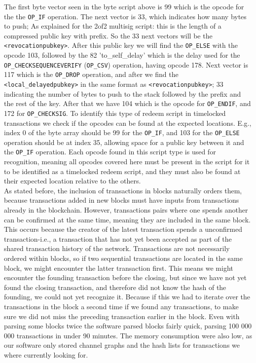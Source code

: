 The first byte vector seen in the byte script above is 99 which is the opcode for the the {\tt OP\_IF} operation. The next vector is 33, which indicates how many bytes to push; As explained for the 2of2 multisig script: this is the length of a compressed public key with prefix. So the 33 next vectors will be the {\tt <revocationpubkey>}. After this public key we will find the {\tt OP\_ELSE} with the opcode 103, followed by the 82 'to\_self\_delay' which is the delay used for the {\tt OP\_CHECKSEQUENCEVERIFY} ({\tt OP\_CSV}) operation, having opcode 178. 
Next vector is 117 which is the {\tt OP\_DROP} operation, and after we find the {\tt <local\_delayedpubkey>} in the same format as {\tt <revocationpubkey>}; 33 indicating the number of bytes to push to the stack followed by the prefix and the rest of the key. After that we have 104 which is the opcode for {\tt OP\_ENDIF}, and 172 for {\tt OP\_CHECKSIG}.
To identify this type of redeem script in timelocked transactions we check if the opcodes can be found at the expected locations. E.g., index 0 of the byte array should be 99 for the {\tt OP\_IF}, and 103 for the {\tt OP\_ELSE} operation should be at index 35, allowing space for a public key between it and the {\tt OP\_IF} operation. Each opcode found in this script type is used for recognition, meaning all opcodes covered here must be present in the script for it to be identified as a timelocked redeem script, and they must also be found at their expected location relative to the others.
\\

As stated before, the inclusion of transactions in blocks naturally orders them, because transactions added in new blocks must have inputs from transactions already in the blockchain.
However, transactions pairs where one spends another can be confirmed at the same time, meaning they are included in the same block.
This occurs because the creator of the latest transaction spends a unconfirmed transaction-i.e., a transaction that has not yet been accepted as part of the shared transaction history of the network. 
Transactions are not necessarily ordered within blocks, so if two sequential transactions are located in the same block, we might encounter the latter transaction first.
This means we might encounter the founding transaction before the closing, but since we have not yet found the closing transaction, and therefore did not know the hash of the founding, we could not yet recognize it.
Because if this we had to iterate over the transactions in the block a second time if we found any transactions, to make sure we did not miss the preceding transaction earlier in the block.
Even with parsing some blocks twice the software parsed blocks fairly quick, parsing 100 000 000 transactions in under 90 minutes.
The memory consumption were also low, as our software only stored channel graphs and the hash lists for transactions we where currently looking for.

